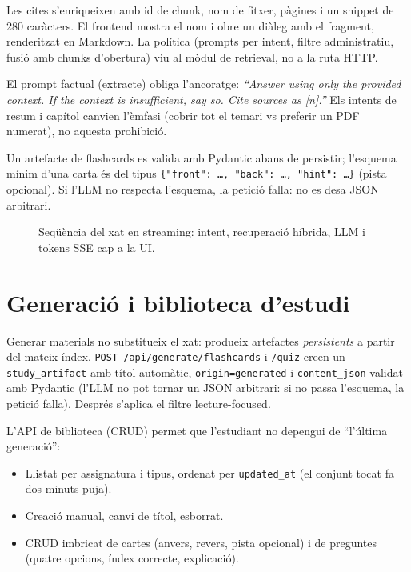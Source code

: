 Les cites s'enriqueixen amb id de chunk, nom de fitxer, pàgines i un snippet de 280 caràcters. El frontend mostra el nom i obre un diàleg amb el fragment, renderitzat en Markdown. La política (prompts per intent, filtre administratiu, fusió amb chunks d'obertura) viu al mòdul de retrieval, no a la ruta HTTP.

El prompt factual (extracte) obliga l'ancoratge: \emph{``Answer using only the provided context. If the context is insufficient, say so. Cite sources as [n].''} Els intents de resum i capítol canvien l'èmfasi (cobrir tot el temari vs preferir un PDF numerat), no aquesta prohibició.

Un artefacte de flashcards es valida amb Pydantic abans de persistir; l'esquema mínim d'una carta és del tipus \texttt{\{"front": \ldots, "back": \ldots, "hint": \ldots\}} (pista opcional). Si l'LLM no respecta l'esquema, la petició falla: no es desa JSON arbitrari.

\begin{figure}[htbp]
\centering

\caption{Seqüència del xat en streaming: intent, recuperació híbrida, LLM i tokens SSE cap a la UI.}
\label{fig:seq-chat}
\end{figure}

\section{Generació i biblioteca d'estudi}

Generar materials no substitueix el xat: produeix artefactes \emph{persistents} a partir del mateix índex. \texttt{POST /api/generate/flashcards} i \texttt{/quiz} creen un \texttt{study\_artifact} amb títol automàtic, \texttt{origin=generated} i \texttt{content\_json} validat amb Pydantic (l'LLM no pot tornar un JSON arbitrari: si no passa l'esquema, la petició falla). Després s'aplica el filtre lecture-focused.

L'API de biblioteca (CRUD) permet que l'estudiant no depengui de ``l'última generació'':

\begin{itemize}
  \item Llistat per assignatura i tipus, ordenat per \texttt{updated\_at} (el conjunt tocat fa dos minuts puja).
  \item Creació manual, canvi de títol, esborrat.
  \item CRUD imbricat de cartes (anvers, revers, pista opcional) i de preguntes (quatre opcions, índex correcte, explicació).
\end{itemize}

